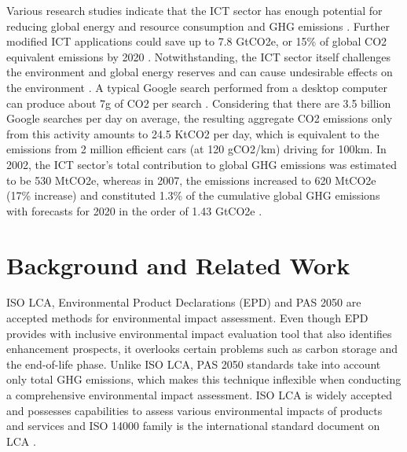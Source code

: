 \documentclass[3p,times,procedia]{elsarticle}
\begin{document}
Various research studies indicate that the ICT sector has enough potential for reducing global energy and resource consumption and GHG emissions  \cite{10046363,924525, 6360455}. Further modified ICT applications could save up to 7.8 GtCO2e, or 15\% of global CO2 equivalent emissions by 2020 \cite{s3758490, 7282419}. Notwithstanding, the ICT sector itself challenges the environment and global energy reserves and can cause undesirable effects on the environment  \cite{Hilty20061618, 6083606, Bull201410}. A typical Google search performed from a desktop computer can produce about 7g of CO2 per search \cite{7282419}. Considering that there are 3.5 billion Google searches per day on average, the resulting aggregate CO2 emissions only from this activity amounts to 24.5 KtCO2 per day, which is equivalent to the emissions from 2 million efficient cars (at 120 gCO2/km) driving for 100km. In 2002, the ICT sector's total contribution to global GHG emissions was estimated to be 530 MtCO2e, whereas in 2007, the emissions increased to 620 MtCO2e (17\% increase) and constituted 1.3\% of the cumulative global GHG emissions with forecasts for 2020 in the order of 1.43 GtCO2e  \cite{malmodin2013future, s3758490}. 

\section{Background and Related Work} 

ISO LCA\cite{ISO140402006}, Environmental Product Declarations (EPD)\cite{iso2006environmental} and PAS 2050 \cite{pas20082050} are accepted methods for environmental impact assessment. Even though EPD provides with inclusive environmental impact evaluation tool that also identifies enhancement prospects, it overlooks certain problems such as carbon storage and the end-of-life phase. Unlike ISO LCA, PAS 2050 standards take into account only total GHG emissions, which makes this technique inflexible when conducting a comprehensive environmental impact assessment. ISO LCA is widely accepted and possesses capabilities to assess various environmental impacts of products and services \cite{cooper2006life} and ISO 14000 family is the international standard document on LCA \cite{finkbeiner201340s}.\\
\end{document}
